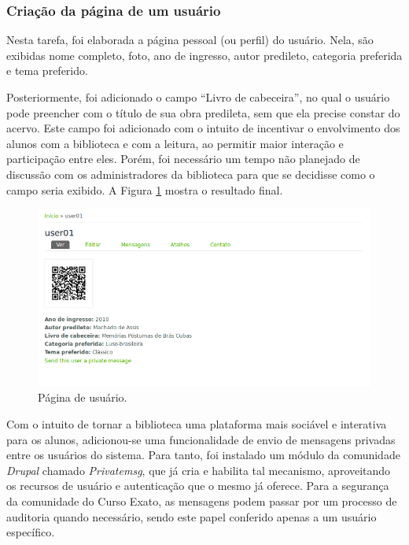 \documentclass[a4paper]{article}
\begin{document}
\subsubsection{Criação da página de um usuário}

Nesta tarefa, foi elaborada a página pessoal (ou perfil) do usuário. Nela, são exibidas nome completo, foto, ano de ingresso, autor predileto, categoria preferida e tema preferido.

Posteriormente, foi adicionado o campo “Livro de cabeceira”, no qual o usuário pode preencher com o título de sua obra predileta, sem que ela precise constar do acervo. Este campo foi adicionado com o intuito de incentivar o envolvimento dos alunos com a biblioteca e com a leitura, ao permitir maior interação e participação entre eles. Porém, foi necessário um tempo não planejado de discussão com os administradores da biblioteca para que se decidisse como o campo seria exibido. A Figura \ref{userpage} mostra o resultado final.

\begin{figure}[pbth!]
\centering
\includegraphics[width=140mm]{img/userpage.png}
\caption{Página de usuário.\label{userpage}}
\end{figure}

Com o intuito de tornar a biblioteca uma plataforma mais sociável e interativa para os alunos, adicionou-se uma funcionalidade de envio de mensagens privadas entre os usuários do sistema. Para tanto, foi instalado um módulo da comunidade \textit{Drupal} chamado \textit{Privatemsg}, que já cria e habilita tal mecanismo, aproveitando os recursos de usuário e autenticação que o mesmo já oferece. Para a segurança da comunidade do Curso Exato, as mensagens podem passar por um processo de auditoria quando necessário, sendo este papel conferido apenas a um usuário específico.
\end{document}
